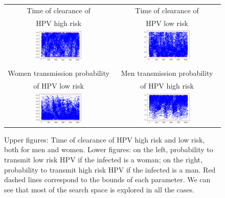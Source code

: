 \begin{figure}[!h]
\begin{center}	
\begin{tabular}{cc}
	Time of clearance of        & Time of clearance of \\
	HPV high risk               & HPV low risk          \\
	\includegraphics[width=0.45\textwidth]{IMGs/1.-Calibrado/Dura_HR_H.png} & \includegraphics[width=0.45\textwidth]{IMGs/1.-Calibrado/Dura_LR_H.png} \\ 
	\\
	Women transmission probability & Men transmission probability \\
	of HPV low risk                & of HPV high risk             \\
	\includegraphics[width=0.45\textwidth]{IMGs/1.-Calibrado/Ctg_M_LR.png} & \includegraphics[width=0.45\textwidth]{IMGs/1.-Calibrado/Ctg_H_HR.png}  
\end{tabular}
\caption{Upper figures: Time of clearance of HPV high risk and low risk, both for men and women. Lower figures: on the left, probability to transmit low risk HPV if the infected is a woman; on the right, probability to transmit high risk HPV if the infected is a man. Red dashed lines correspond to the bounds of each parameter. We can see that most of the search space is explored in all the cases.} 
\label{Ctg}
\end{center}
\end{figure}

